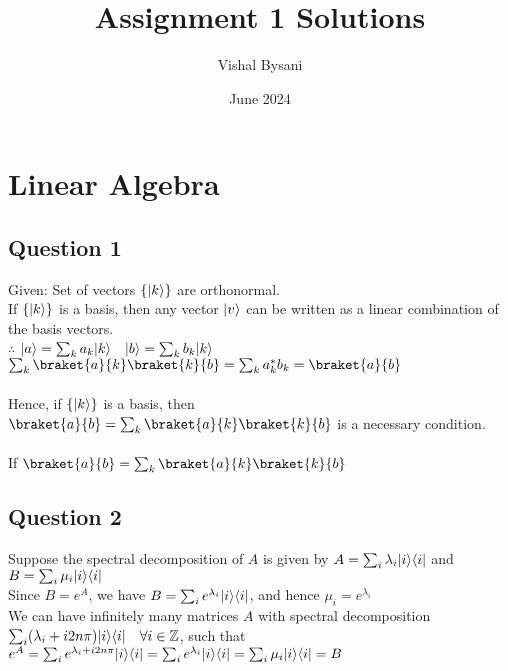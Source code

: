 \documentclass{article}
\title{Assignment 1 Solutions}
\author{Vishal Bysani}
\date{June 2024}
\DeclarePairedDelimiter\bra{\langle}{\rvert}
\DeclarePairedDelimiter\ket{\lvert}{\rangle}
\begin{document}
\maketitle
\section{Linear Algebra}
\subsection{Question 1}
Given:  Set of vectors $\{\ket{k}\} $ are orthonormal.\\

\noindent
If $\{\ket{k}\} $ is a basis, then any vector $\ket{v}$ can be written as a linear combination of the basis vectors.\\

$\therefore$ $\ket{a} = \sum_{k} a_k \ket{k}  \quad \ket{b} = \sum_{k} b_k \ket{k}$\\

\noindent
$\sum_{k} \braket{a}{k} \braket{k}{b} = \sum_{k} a_k^* b_k = \braket{a}{b}$\\\\
\noindent
Hence, if $\{\ket{k}\} $ is a basis, then $\braket{a}{b} = \sum_{k} \braket{a}{k} \braket{k}{b}$ is a necessary condition.\\\\

\noindent
If $\braket{a}{b} = \sum_{k} \braket{a}{k} \braket{k}{b}$\\



\subsection{Question 2}
Suppose the spectral decomposition of $A$ is given by $A = \sum_{i} \lambda_i \ket{i}\bra{i}$ and $B = \sum_{i} \mu_i \ket{i}\bra{i}$\\

\noindent
Since $B= e^A$, we have $B = \sum_{i} e^{\lambda_i} \ket{i}\bra{i}$, and hence $\mu_i = e^{\lambda_i}$\\

\noindent
We can have infinitely many matrices $A$ with spectral decomposition $\sum_{i} (\lambda_i + i2n\pi) \ket{i}\bra{i}  \quad \forall i \in \mathbb{Z}  $, such that $e^A = \sum_i e^{\lambda_i+ i2n\pi} \ket{i}\bra{i} = \sum_i e^{\lambda_i} \ket{i}\bra{i} = \sum_i \mu_i \ket{i}\bra{i} = B$\\
\end{document}
